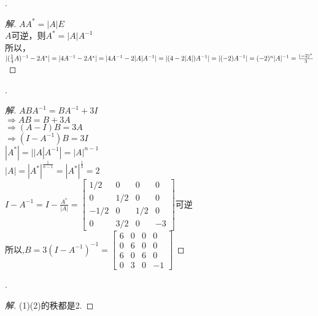 \documentclass[10pt,a4paper]{report}
\begin{document}
.
\begin{proof}[解]
	$AA^{*}=|A|E$\\
	$A$可逆，则$A^{*}=|A|A^{-1}$\\
	所以，$|(\frac{1}{4}A)^{-1}-2A^{*}|\\
	=|4A^{-1} - 2A^{*}|\\
	=|4A^{-1} - 2|A|A^{-1}|\\
	=|(4-2|A|)A^{-1}|\\
	=|(-2)A^{-1}|\\
	=(-2)^{n}|A|^{-1}\\
	=\frac{(-2)^{n}}{3}
	$
\end{proof}
.
\begin{proof}[解]
	$ABA^{-1}=BA^{-1}+3I$\\
	$\Rightarrow AB = B+3A$\\
	$\Rightarrow (A-I)B=3A$\\
	$\Rightarrow (I-A^{-1})B=3I$\\
	$|A^{*}| = ||A|A^{-1}|=|A|^{n-1}$\\
	$|A| = |A^{*}|^{\frac{1}{n-1}} = |A^{*}|^{\frac{1}{3}} = 2$\\
	$I-A^{-1} = I-\frac{A^{*}}{|A|} = \left[
	\begin{matrix}
	1/2 & 0 & 0 & 0\\
	0 & 1/2 & 0 & 0\\
	-1/2 & 0 & 1/2 & 0\\
	0 & 3/2 & 0 & -3
	\end{matrix}
	\right]$可逆\\
	所以,$B=3(I-A^{-1})^{-1} = \left[
	\begin{matrix}
	6 & 0 & 0 & 0\\
	0 & 6 & 0 & 0\\
	6 & 0 & 6 & 0\\
	0 & 3 & 0 & -1
	\end{matrix}
	\right]$
\end{proof}
.
\begin{proof}[解]
	(1)(2)的秩都是2.
\end{proof}
\end{document}
